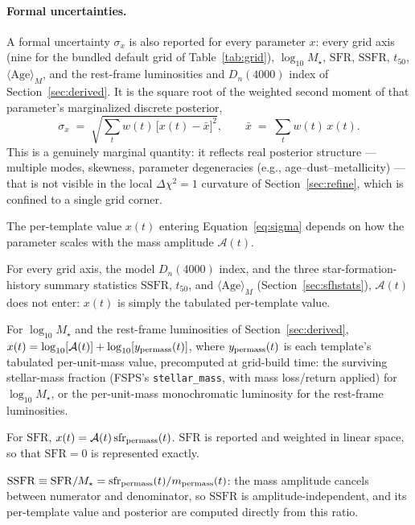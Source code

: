 \documentclass[12pt]{article}
\newcommand{\chisq}{\chi^2}
\newcommand{\amp}{\mathcal{A}}
\begin{document}
\paragraph{Formal uncertainties.} A formal uncertainty $\sigma_x$ is also
reported for every parameter $x$: every grid axis (nine for the bundled
default grid of Table~\ref{tab:grid}), $\log_{10} M_\star$,
$\mathrm{SFR}$, $\mathrm{SSFR}$, $t_{50}$, $\langle\mathrm{Age}\rangle_M$,
and the rest-frame luminosities and $D_n(4000)$ index of
Section~\ref{sec:derived}. It is the square root of the weighted second
moment of that parameter's marginalized discrete posterior,
\begin{equation}
  \sigma_x \;=\; \sqrt{\sum_t w(t)\,\bigl[x(t) - \bar{x}\bigr]^2},
  \qquad \bar{x} \;=\; \sum_t w(t)\, x(t).
  \label{eq:sigma}
\end{equation}
This is a genuinely marginal quantity: it reflects real posterior
structure --- multiple modes, skewness, parameter degeneracies (e.g.,
age--dust--metallicity) --- that is not visible in the local
$\Delta\chisq=1$ curvature of Section~\ref{sec:refine}, which is confined
to a single grid corner.

The per-template value $x(t)$ entering Equation~\ref{eq:sigma} depends on
how the parameter scales with the mass amplitude $\amp(t)$.

For every grid axis, the model $D_n(4000)$ index, and the three
star-formation-history summary statistics $\mathrm{SSFR}$, $t_{50}$, and
$\langle\mathrm{Age}\rangle_M$ (Section~\ref{sec:sfhstats}), $\amp(t)$
does not enter: $x(t)$ is simply the tabulated per-template value.

For $\log_{10} M_\star$ and the rest-frame luminosities of
Section~\ref{sec:derived}, $x(t) = \log_{10}[\amp(t)] +
\log_{10}[y_{\rm permass}(t)]$, where $y_{\rm permass}(t)$ is each
template's tabulated per-unit-mass value, precomputed at grid-build time:
the surviving stellar-mass fraction (FSPS's \texttt{stellar\_mass}, with
mass loss/return applied) for $\log_{10} M_\star$, or the per-unit-mass
monochromatic luminosity for the rest-frame luminosities.

For $\mathrm{SFR}$, $x(t) = \amp(t)\, \mathrm{sfr}_{\rm permass}(t)$.
$\mathrm{SFR}$ is reported and weighted in linear space, so that
$\mathrm{SFR}=0$ is represented exactly.

$\mathrm{SSFR} \equiv \mathrm{SFR}/M_\star = \mathrm{sfr}_{\rm
permass}(t)/m_{\rm permass}(t)$: the mass amplitude cancels between
numerator and denominator, so $\mathrm{SSFR}$ is amplitude-independent,
and its per-template value and posterior are computed directly from this
ratio.
\end{document}
